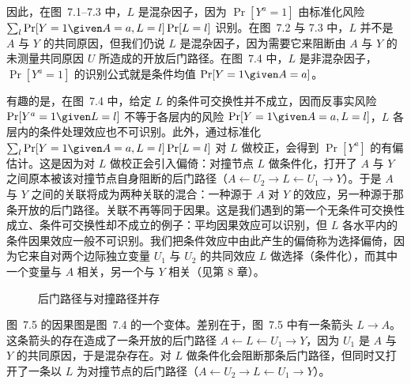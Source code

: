 因此，在图~7.1–7.3 中，$L$ 是混杂因子，因为 $\Pr[Y^{a}=1]$ 由标准化风险 $\sum_l \Pr[Y=1\given A=a,L=l]\Pr[L=l]$ 识别。在图~7.2 与 7.3 中，$L$ 并不是 $A$ 与 $Y$ 的共同原因，但我们仍说 $L$ 是混杂因子，因为需要它来阻断由 $A$ 与 $Y$ 的未测量共同原因 $U$ 所造成的开放后门路径。在图~7.4 中，$L$ 是非混杂因子，$\Pr[Y^{a}=1]$ 的识别公式就是条件均值 $\Pr[Y=1\given A=a]$。


有趣的是，在图~7.4 中，给定 $L$ 的条件可交换性并不成立，因而反事实风险 $\Pr[Y^{a}=1\given L=l]$ 不等于各层内的风险 $\Pr[Y=1\given A=a,L=l]$，$L$ 各层内的条件处理效应也不可识别。此外，通过标准化 $\sum_l \Pr[Y=1\given A=a,L=l]\Pr[L=l]$ 对 $L$ 做校正，会得到 $\Pr[Y^{a}]$ 的有偏估计。这是因为对 $L$ 做校正会引入偏倚：对撞节点 $L$ 做条件化，打开了 $A$ 与 $Y$ 之间原本被该对撞节点自身阻断的后门路径（$A\leftarrow U_2\to L\leftarrow U_1\to Y$）。于是 $A$ 与 $Y$ 之间的关联将成为两种关联的混合：一种源于 $A$ 对 $Y$ 的效应，另一种源于那条开放的后门路径。关联不再等同于因果。这是我们遇到的第一个无条件可交换性成立、条件可交换性却不成立的例子：平均因果效应可以识别，但 $L$ 各水平内的条件因果效应一般不可识别。我们把条件效应中由此产生的偏倚称为选择偏倚，因为它来自对两个边际独立变量 $U_1$ 与 $U_2$ 的共同效应 $L$ 做选择（条件化），而其中一个变量与 $A$ 相关，另一个与 $Y$ 相关（见第 8 章）。

\begin{figure}[htbp]
\centering
{}
\caption{后门路径与对撞路径并存}
\label{fig:7.5}
\end{figure}

图~7.5 的因果图是图~7.4 的一个变体。差别在于，图~7.5 中有一条箭头 $L\to A$。这条箭头的存在造成了一条开放的后门路径 $A\leftarrow L\leftarrow U_1\to Y$，因为 $U_1$ 是 $A$ 与 $Y$ 的共同原因，于是混杂存在。对 $L$ 做条件化会阻断那条后门路径，但同时又打开了一条以 $L$ 为对撞节点的后门路径（$A\leftarrow U_2\to L\leftarrow U_1\to Y$）。

